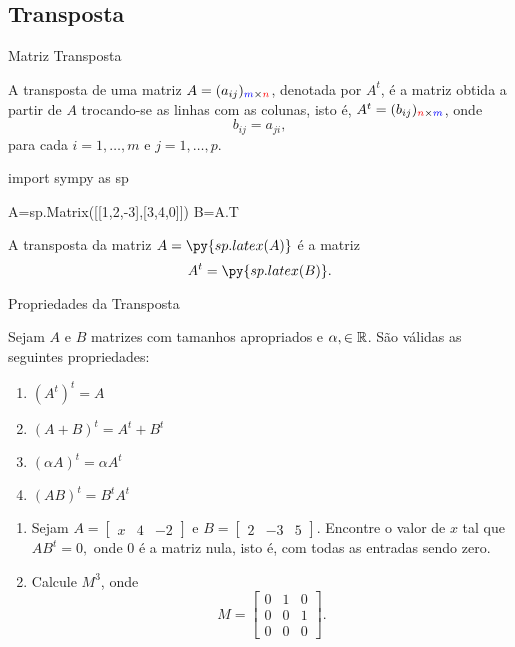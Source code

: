\subsection*{Transposta}
\begin{frame}[label=matrizes,fragile=singleslide]{Matriz Transposta}

A {\color{blue} transposta} de uma matriz $A=(a_{ij})_{{\color{blue}m}\times {\color{red}n}}$, denotada por $A^t$,  é a matriz obtida a partir de $A$ trocando-se as linhas com as colunas, isto é,  $A^t=(b_{ij})_{{\color{red}n}\times {\color{blue}m}}$, onde
\[b_{ij}=a_{ji},\]
para cada $i=1,\ldots,m$ e $j=1,\ldots,p$.


\begin{pycode}
import sympy as sp

A=sp.Matrix([[1,2,-3],[3,4,0]])
B=A.T
\end{pycode}

\begin{exe}
A transposta da matriz  $A=\py{sp.latex(A)} $ é a matriz 
\[A^t=\py{sp.latex(B)}.\]
\end{exe}

\end{frame}




\begin{frame}[label=matrizes,fragile=singleslide]{Propriedades da Transposta}

Sejam $A$ e $B$ matrizes com tamanhos apropriados e $\alpha,\in \mathbb{R}$. São válidas as seguintes propriedades:

\begin{enumerate}
\item $(A^t)^t=A$ 
\item $(A+B)^t=A^t+B^t$
\item $(\alpha A)^t=\alpha A^t$
\item $(AB)^t=B^tA^t$
\end{enumerate}

\end{frame}

\begin{frame}
\begin{casa}
\begin{enumerate}
\item Sejam    $A=\begin{bmatrix} x & 4 &  -2 \end{bmatrix}$  e  $B=\begin{bmatrix} 2 & -3 & 5 \end{bmatrix}$. Encontre o valor de $x$ tal que $AB^t=0,$ onde $0$ é a matriz nula, isto é, com todas as entradas sendo zero.

\item Calcule $M^3$, onde 
\[M=\begin{bmatrix}
0 & 1 & 0\\
0 & 0 & 1\\
0 & 0 & 0
\end{bmatrix}.
\]
\end{enumerate}
\end{casa}
\end{frame}

